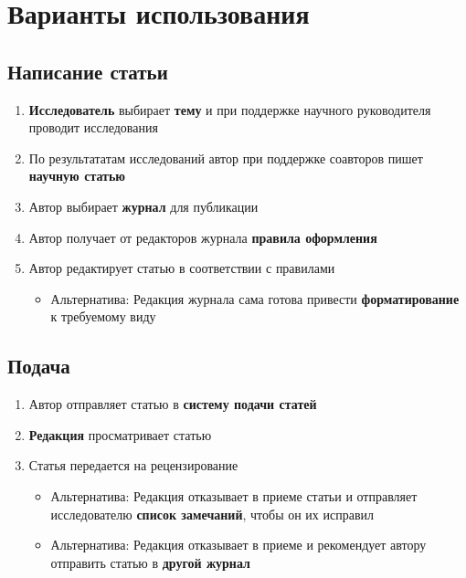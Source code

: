 \section{Варианты использования}

\subsection{Написание статьи}

\begin{enumerate}
\item
  \textbf{Исследователь} выбирает \textbf{тему} и при поддержке научного
  руководителя проводит исследования
\item
  По результататам исследований автор при поддержке соавторов пишет
  \textbf{научную статью}
\item
  Автор выбирает \textbf{журнал} для публикации
\item
  Автор получает от редакторов журнала \textbf{правила оформления}
\item
  Автор редактирует статью в соответствии с правилами
  
  \begin{itemize}
  \item
    Альтернатива: Редакция журнала сама готова привести
    \textbf{форматирование} к требуемому виду
  \end{itemize}
\end{enumerate}

\subsection{Подача}

\begin{enumerate}
\item
  Автор отправляет статью в \textbf{систему подачи статей}
\item
  \textbf{Редакция} просматривает статью
\item
  Статья передается на рецензирование
  
  \begin{itemize}
  \item
    Альтернатива: Редакция отказывает в приеме статьи и отправляет
    исследователю \textbf{список замечаний}, чтобы он их исправил
  \item
    Альтернатива: Редакция отказывает в приеме и рекомендует автору
    отправить статью в \textbf{другой журнал}
  \end{itemize}
\end{enumerate}

